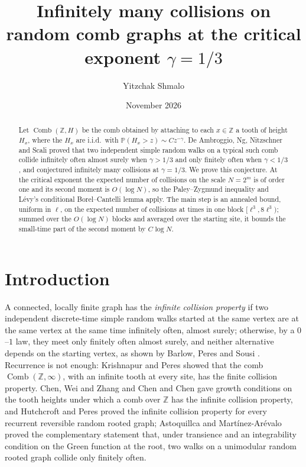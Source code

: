 \documentclass[11pt]{amsart}
\title[Collisions on random combs at the critical exponent]{Infinitely many collisions on random comb graphs at the critical exponent $\gamma=1/3$}
\author{Yitzchak Shmalo}
\date{November 2026}
\theoremstyle{remark}
\numberwithin{equation}{section}
\newcommand{\Comb}{\operatorname{Comb}}
\newcommand{\PP}{\mathbb{P}}
\newcommand{\Z}{\mathbb{Z}}
\begin{document}
\begin{abstract}
Let $\Comb(\Z,H)$ be the comb obtained by attaching to each $x\in\Z$ a tooth of height $H_x$, where the $H_x$ are i.i.d.\ with $\PP(H_x>z)\sim Cz^{-\gamma}$. De Ambroggio, Ng, Nitzschner and Scali proved that two independent simple random walks on a typical such comb collide infinitely often almost surely when $\gamma>1/3$ and only finitely often when $\gamma<1/3$, and conjectured infinitely many collisions at $\gamma=1/3$. We prove this conjecture. At the critical exponent the expected number of collisions on the scale $N=2^m$ is of order one and its second moment is $O(\log N)$, so the Paley--Zygmund inequality and L\'evy's conditional Borel--Cantelli lemma apply. The main step is an annealed bound, uniform in $\ell$, on the expected number of collisions at times in one block $[\ell^3,8\ell^3)$; summed over the $O(\log N)$ blocks and averaged over the starting site, it bounds the small-time part of the second moment by $C\log N$.
\end{abstract}
\maketitle

\section{Introduction}\label{sec:intro}
A connected, locally finite graph has the \emph{infinite collision property} if two independent discrete-time simple random walks started at the same vertex are at the same vertex at the same time infinitely often, almost surely; otherwise, by a $0$--$1$ law, they meet only finitely often almost surely, and neither alternative depends on the starting vertex, as shown by Barlow, Peres and Sousi \cite{BPS}. Recurrence is not enough: Krishnapur and Peres \cite{KP} showed that the comb $\Comb(\Z,\infty)$, with an infinite tooth at every site, has the finite collision property. Chen, Wei and Zhang \cite{CWZ} and Chen and Chen \cite{CC} gave growth conditions on the tooth heights under which a comb over $\Z$ has the infinite collision property, and Hutchcroft and Peres \cite{HP} proved the infinite collision property for every recurrent reversible random rooted graph; Astoquillca and Mart\'inez-Ar\'evalo \cite{AM} proved the complementary statement that, under transience and an integrability condition on the Green function at the root, two walks on a unimodular random rooted graph collide only finitely often.
\end{document}
